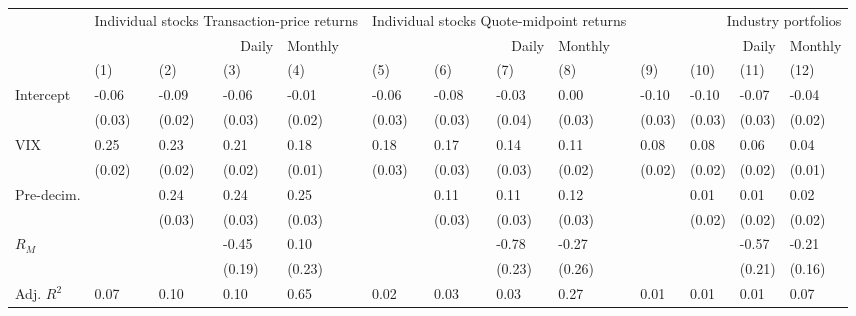 \begin{tabular}{lllllllllllll}
\toprule
 & \multicolumn{4}{r}{Individual stocks
Transaction-price returns} & \multicolumn{4}{r}{Individual stocks
Quote-midpoint returns} & \multicolumn{4}{r}{Industry
portfolios} \\
 & \multicolumn{3}{r}{Daily} & Monthly & \multicolumn{3}{r}{Daily} & Monthly & \multicolumn{3}{r}{Daily} & Monthly \\
 & (1) & (2) & (3) & (4) & (5) & (6) & (7) & (8) & (9) & (10) & (11) & (12) \\
\midrule
Intercept & -0.06 & -0.09 & -0.06 & -0.01 & -0.06 & -0.08 & -0.03 & 0.00 & -0.10 & -0.10 & -0.07 & -0.04 \\
 & (0.03) & (0.02) & (0.03) & (0.02) & (0.03) & (0.03) & (0.04) & (0.03) & (0.03) & (0.03) & (0.03) & (0.02) \\
VIX & 0.25 & 0.23 & 0.21 & 0.18 & 0.18 & 0.17 & 0.14 & 0.11 & 0.08 & 0.08 & 0.06 & 0.04 \\
 & (0.02) & (0.02) & (0.02) & (0.01) & (0.03) & (0.03) & (0.03) & (0.02) & (0.02) & (0.02) & (0.02) & (0.01) \\
Pre-decim. &  & 0.24 & 0.24 & 0.25 &  & 0.11 & 0.11 & 0.12 &  & 0.01 & 0.01 & 0.02 \\
 &  & (0.03) & (0.03) & (0.03) &  & (0.03) & (0.03) & (0.03) &  & (0.02) & (0.02) & (0.02) \\
$R_M$ &  &  & -0.45 & 0.10 &  &  & -0.78 & -0.27 &  &  & -0.57 & -0.21 \\
 &  &  & (0.19) & (0.23) &  &  & (0.23) & (0.26) &  &  & (0.21) & (0.16) \\
Adj. $R^2$ & 0.07 & 0.10 & 0.10 & 0.65 & 0.02 & 0.03 & 0.03 & 0.27 & 0.01 & 0.01 & 0.01 & 0.07 \\
\bottomrule
\end{tabular}
